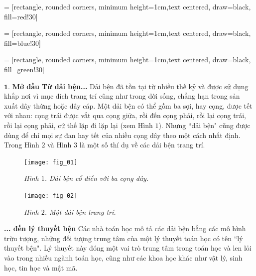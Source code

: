 \vspace*{175pt}

 = [rectangle, rounded corners, minimum height=1cm,text centered, draw=black, fill=red!30]

 = [rectangle, rounded corners, minimum height=1cm,text centered, draw=black, fill=blue!30]

 = [rectangle, rounded corners, minimum height=1cm,text centered, draw=black, fill=green!30]

\begin{multicols}{2}	
	$\pmb{1.}$ \textbf{\color{duongvaotoanhoc}Mở đầu}
	\vskip 0.1cm
	\textbf{\color{duongvaotoanhoc}Từ dải bện...}
	\vskip 0.1cm
	Dải bện đã tồn tại từ nhiều thế kỷ và được sử dụng khắp nơi vì mục đích trang trí cũng như trong đời sống, chẳng hạn trong sản xuất dây thừng hoặc dây cáp. Một dải bện có thể gồm ba sợi, hay cọng, được tết với nhau: cọng trái được vắt qua cọng giữa, rồi đến cọng phải, rồi lại cọng trái, rồi lại cọng phải, cứ thế lặp đi lặp lại (xem Hình $1$). Nhưng ``dải bện" cũng được dùng để chỉ mọi sự đan hay tết của nhiều cọng dây theo một cách nhất định. Trong Hình $2$ và Hình $3$ là một số thí dụ về các dải bện trang trí.
	\begin{figure}[H]
		\vspace*{-5pt}
		\centering
		\captionsetup{labelformat= empty, justification=centering}
		\texttt{[image: fig\_01]}
		\caption{\small\textit{\color{duongvaotoanhoc}Hình $1$. Dải bện cổ điển với ba cọng dây.}}
		\vspace*{-10pt}
	\end{figure}
	\begin{figure}[H]
		\vspace*{-10pt}
		\centering
		\captionsetup{labelformat= empty, justification=centering}
		\texttt{[image: fig\_02]}
		\caption{\small\textit{\color{duongvaotoanhoc}Hình $2$. Một dải bện trang trí.}}
		\vspace*{-5pt}
	\end{figure}
	\textbf{\color{duongvaotoanhoc}... đến lý thuyết bện}
	\vskip 0.1cm
	Các nhà toán học mô tả các dải bện bằng các mô hình trừu tượng, những đối tượng trung tâm của một lý thuyết toán học có tên ``lý thuyết bện". Lý thuyết này đóng một vai trò trung tâm trong toán học và len lỏi vào trong nhiều ngành toán học, cũng như các khoa học khác như vật lý, sinh học, tin học và mật mã.
	\begin{figure}[H]
		\vspace*{-10pt}
		\centering
		\captionsetup{labelformat= empty, justification=centering}

\end{figure}
\end{multicols}
